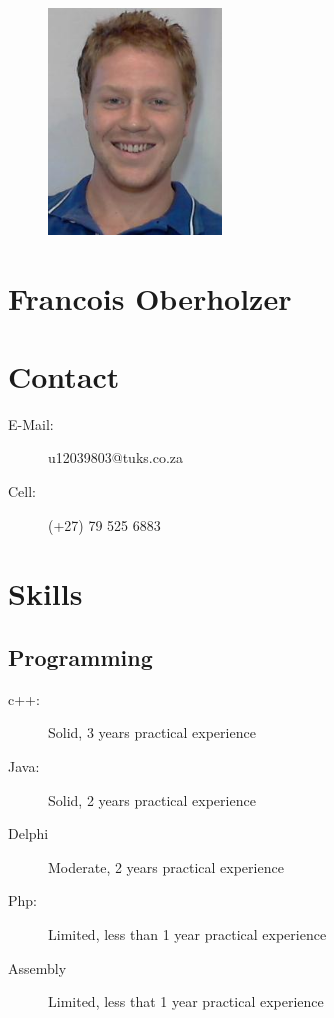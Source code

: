 \documentclass[a4paper]{article}
\begin{document}
\begin{center}
	\begin{figure}[H]
		\centering
		\includegraphics[height=6cm]{francois}
	\end{figure}
\end{center}

\section*
{
	\Huge{Francois Oberholzer}
}
\vspace{0.5cm}

\section*{Contact}
	\begin{description}
		\item[E-Mail:] u12039803@tuks.co.za
		\item[Cell:] (+27) 79 525 6883
	\end{description}

\section*{Skills}

	\subsection*{Programming}
		\begin{description}
			\item[c++:]Solid, 3 years practical experience
			\item[Java:]Solid, 2 years practical experience
			\item[Delphi]Moderate, 2 years practical experience
            \item[Php:]Limited, less than 1 year practical experience
            \item[Assembly]Limited, less that 1 year practical experience
		\end{description}
\end{document}
